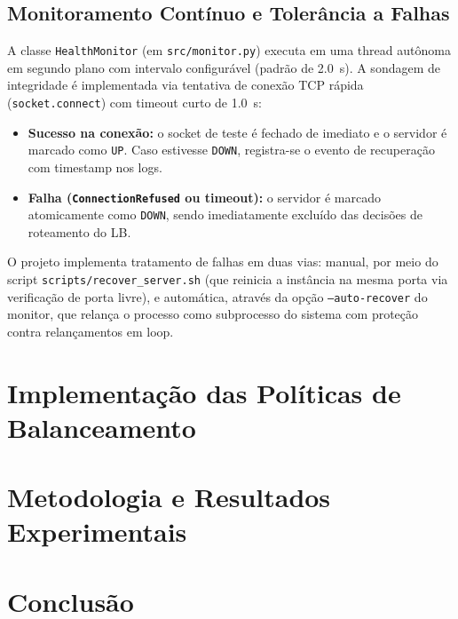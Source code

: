 \documentclass[11pt,a4paper]{article}
\begin{document}
\subsection{Monitoramento Contínuo e Tolerância a Falhas}
A classe \texttt{HealthMonitor} (em \texttt{src/monitor.py}) executa em uma thread autônoma em segundo plano com intervalo configurável (padrão de \SI{2.0}{\second}). A sondagem de integridade é implementada via tentativa de conexão TCP rápida (\texttt{socket.connect}) com timeout curto de \SI{1.0}{\second}:
\begin{itemize}
    \item \textbf{Sucesso na conexão:} o socket de teste é fechado de imediato e o servidor é marcado como \texttt{UP}. Caso estivesse \texttt{DOWN}, registra-se o evento de recuperação com timestamp nos logs.
    \item \textbf{Falha (\texttt{ConnectionRefused} ou timeout):} o servidor é marcado atomicamente como \texttt{DOWN}, sendo imediatamente excluído das decisões de roteamento do LB.
\end{itemize}
O projeto implementa tratamento de falhas em duas vias: manual, por meio do script \texttt{scripts/recover\_server.sh} (que reinicia a instância na mesma porta via verificação de porta livre), e automática, através da opção \texttt{--auto-recover} do monitor, que relança o processo como subprocesso do sistema com proteção contra relançamentos em loop.

\section{Implementação das Políticas de Balanceamento}



\section{Metodologia e Resultados Experimentais}



\section{Conclusão}



\end{document}
